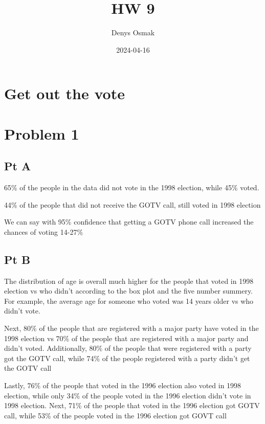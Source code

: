 \documentclass[
]{article}
\title{HW 9}
\author{Denys Osmak}
\date{2024-04-16}
\begin{document}
\maketitle

\hypertarget{get-out-the-vote}{%
\section{Get out the vote}\label{get-out-the-vote}}

\hypertarget{problem-1}{%
\section{Problem 1}\label{problem-1}}

\hypertarget{pt-a}{%
\subsection{Pt A}\label{pt-a}}

65\% of the people in the data did not vote in the 1998 election, while
45\% voted.

44\% of the people that did not receive the GOTV call, still voted in
1998 election

We can say with 95\% confidence that getting a GOTV phone call increased
the chances of voting 14-27\%

\hypertarget{pt-b}{%
\subsection{Pt B}\label{pt-b}}

The distribution of age is overall much higher for the people that voted
in 1998 election vs who didn't according to the box plot and the five
number summery. For example, the average age for someone who voted was
14 years older vs who didn't vote.

Next, 80\% of the people that are registered with a major party have
voted in the 1998 election vs 70\% of the people that are registered
with a major party and didn't voted. Additionally, 80\% of the people
that were registered with a party got the GOTV call, while 74\% of the
people registered with a party didn't get the GOTV call

Lastly, 76\% of the people that voted in the 1996 election also voted in
1998 election, while only 34\% of the people voted in the 1996 election
didn't vote in 1998 election. Next, 71\% of the people that voted in the
1996 election got GOTV call, while 53\% of the people voted in the 1996
election got GOVT call
\end{document}
